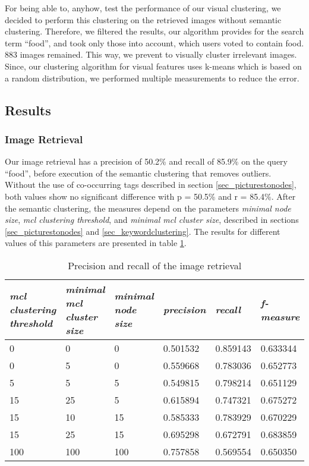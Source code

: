 For being able to, anyhow, test the performance of our visual clustering, we decided to perform this clustering on the retrieved images without semantic clustering.
Therefore, we filtered the results, our algorithm provides for the search term ``food'', and took only those into account, which users voted to contain food. 883 images remained.
This way, we prevent to visually cluster irrelevant images.
Since, our clustering algorithm for visual features uses k-means which is based on a random distribution, we performed multiple measurements to reduce the error.

\subsection{Results}
\label{sec_results}

\subsubsection*{Image Retrieval}

Our image retrieval has a precision of 50.2\% and recall of 85.9\% on the query ``food'', before execution of the semantic clustering that removes outliers. Without the use of co-occurring tags described in section \ref{sec_picturestonodes}, both values show no significant difference with p = 50.5\% and r = 85.4\%.
After the semantic clustering, the measures depend on the  parameters \emph{minimal node size}, \emph{mcl clustering threshold}, and \emph{minimal mcl cluster size}, described in sections \ref{sec_picturestonodes} and \ref{sec_keywordclustering}. The results for different values of this parameters are presented in table \ref{tab_retrievalevaluation}.\\

\begin{table}[h]
   \begin{tabular}{| p{2.2cm}| p{2.2cm}| p{2cm} || p{2cm} | p{2cm} | p{2cm} |}
    \hline
    \emph{mcl clustering threshold} & \emph{minimal mcl cluster size} & \emph{minimal node size} & \emph{precision} & \emph{recall} & \emph{f-measure} \\ \hline
    0 	& 0 	& 0 & 0.501532 & 0.859143 & 0.633344 \\ \hline
    0 	& 5 	& 0 & 0.559668 & 0.783036 & 0.652773 \\ \hline
    5 	& 5 	& 5 & 0.549815 & 0.798214 & 0.651129 \\ \hline
    15 	& 25 &  5 & 0.615894 & 0.747321 & 0.675272 \\ \hline
    15 	& 10 & 15 & 0.585333 & 0.783929 & 0.670229 \\ \hline
    15 	& 25 & 15 & 0.695298 & 0.672791 & 0.683859 \\ \hline
    	100 	& 100 & 100 & 0.757858 & 0.569554 & 0.650350 \\ \hline
    \end{tabular}
    \caption{Precision and recall of the image retrieval}
	\label{tab_retrievalevaluation}
\end{table}


